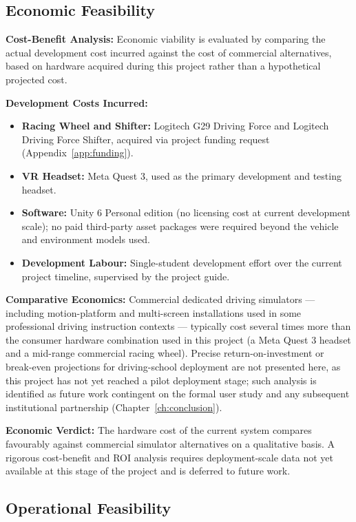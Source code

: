\subsection{Economic Feasibility}

\textbf{Cost-Benefit Analysis:}
Economic viability is evaluated by comparing the actual development cost incurred against the cost of commercial alternatives, based on hardware acquired during this project rather than a hypothetical projected cost.

\textbf{Development Costs Incurred:}
\begin{itemize}
    \item \textbf{Racing Wheel and Shifter:} Logitech G29 Driving Force and Logitech Driving Force Shifter, acquired via project funding request (Appendix~\ref{app:funding}).
    \item \textbf{VR Headset:} Meta Quest 3, used as the primary development and testing headset.
    \item \textbf{Software:} Unity 6 Personal edition (no licensing cost at current development scale); no paid third-party asset packages were required beyond the vehicle and environment models used.
    \item \textbf{Development Labour:} Single-student development effort over the current project timeline, supervised by the project guide.
\end{itemize}

\textbf{Comparative Economics:}
Commercial dedicated driving simulators — including motion-platform and multi-screen installations used in some professional driving instruction contexts — typically cost several times more than the consumer hardware combination used in this project (a Meta Quest 3 headset and a mid-range commercial racing wheel). Precise return-on-investment or break-even projections for driving-school deployment are not presented here, as this project has not yet reached a pilot deployment stage; such analysis is identified as future work contingent on the formal user study and any subsequent institutional partnership (Chapter~\ref{ch:conclusion}).

\textbf{Economic Verdict:} The hardware cost of the current system compares favourably against commercial simulator alternatives on a qualitative basis. A rigorous cost-benefit and ROI analysis requires deployment-scale data not yet available at this stage of the project and is deferred to future work.

\subsection{Operational Feasibility}

